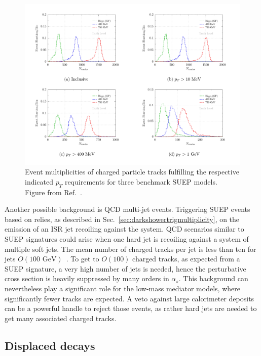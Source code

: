\begin{figure}[tbp]
  \centering
  \includegraphics[width=\textwidth]{figures/DS_chargedParticleMultiplicities_SUEP.pdf}
  \caption{Event multiplicities of charged particle tracks fulfilling the respective indicated $p_{T}$ requirements for three benchmark SUEP models. Figure from Ref.~\cite{Knapen:2016hky}. }
  \label{fig:SUEPchargedParticleMultiplicities}
\end{figure}

Another possible background is QCD multi-jet events. Triggering SUEP events based on \MET relies, as described in Sec.~\ref{sec:darkshowertrigmultiplicity}, on the emission of an ISR jet recoiling against the system. QCD scenarios similar to SUEP signatures could arise when one hard jet is recoiling against a system of multiple soft jets. The mean number of charged tracks per jet is less than ten for jets $O(\text{100~GeV})$~\cite{Aad:2016oit}. To get to $O(100)$ charged tracks, as expected from a SUEP signature, a very high number of jets is needed, hence the perturbative cross section is heavily suppressed by many orders in $\alpha_{s}$. This background can nevertheless play a significant role for the low-mass mediator models, where significantly fewer tracks are expected. A veto against large calorimeter deposits can be a powerful handle to reject those events, as rather hard jets are needed to get many associated charged tracks.

\subsection{Displaced decays} %
\label{sec:darkshowerdisp}

